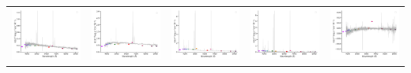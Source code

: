 \begin{center}
\begin{longtable}{l l l l l }
    \includegraphics[width=0.19\linewidth, clip]{Figs/Figs-sdss/spec-0391-51782-0625-STRIPE82-0014-009267.pdf} & \includegraphics[width=0.19\linewidth, clip]{Figs/Figs-sdss/spec-0392-51793-0583-STRIPE82-0016-049657.pdf} & \includegraphics[width=0.19\linewidth, clip]{Figs/Figs-sdss/spec-0287-52023-0466-SPLUS-n01s25-028549.pdf} & \includegraphics[width=0.19\linewidth, clip]{Figs/Figs-sdss/spec-0330-52370-0439-SPLUS-n03s21-047308.pdf} & \includegraphics[width=0.19\linewidth, clip]{Figs/Figs-sdss/spec-0376-52143-0086-STRIPE82-0139-018589.pdf} \\

\end{longtable}
\end{center}
